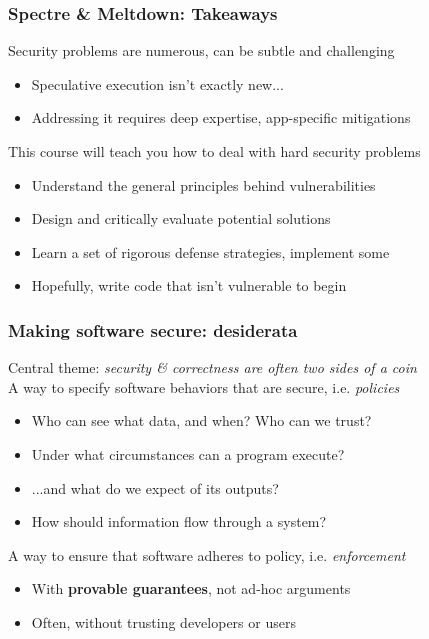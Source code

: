 \documentclass[10pt]{beamer}
\begin{document}

\begin{frame}

\frametitle{Spectre \& Meltdown: Takeaways}

Security problems are numerous, can be subtle and challenging
\begin{itemize}
  \item Speculative execution isn't exactly new...
  \item Addressing it requires deep expertise, app-specific mitigations \\[2em]
\end{itemize}

\pause
This course will teach you how to deal with hard security problems
\begin{itemize}
  \item Understand the general principles behind vulnerabilities
  \item Design and critically evaluate potential solutions
  \item Learn a set of rigorous defense strategies, implement some
  \item Hopefully, write code that isn't vulnerable to begin
\end{itemize}

\end{frame}








\begin{frame}

\frametitle{Making software secure: desiderata}

Central theme: \emph{security \& correctness are often two sides of a coin}
\\[1em]

\pause
A way to specify software behaviors that are secure, i.e. \emph{policies} \pause
\begin{itemize}
  \item Who can see what data, and when? Who can we trust?
  \item Under what circumstances can a program execute?
  \item ...and what do we expect of its outputs?
  \item How should information flow through a system? \\[1em]
\end{itemize}

\pause
A way to ensure that software adheres to policy, i.e. \emph{enforcement} \pause
\begin{itemize}
  \item With \textbf{provable guarantees}, not ad-hoc arguments
  \item Often, without trusting developers or users
\end{itemize}

\end{frame}
\end{document}
